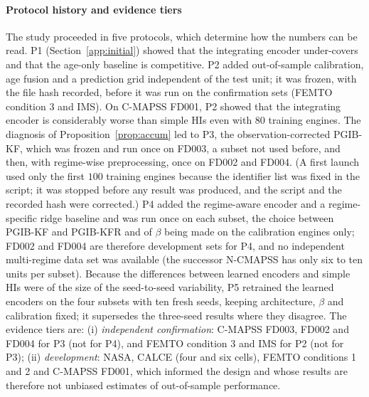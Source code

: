 \documentclass[preprint,12pt]{elsarticle}
\theoremstyle{definition}
\begin{document}
\paragraph{Protocol history and evidence tiers} The study proceeded in five protocols, which determine how the numbers can be read. P1 (Section~\ref{app:initial}) showed that the integrating encoder under-covers and that the age-only baseline is competitive. P2 added out-of-sample calibration, age fusion and a prediction grid independent of the test unit; it was frozen, with the file hash recorded, before it was run on the confirmation sets (FEMTO condition 3 and IMS). On C-MAPSS FD001, P2 showed that the integrating encoder is considerably worse than simple HIs even with $80$ training engines. The diagnosis of Proposition~\ref{prop:accum} led to P3, the observation-corrected PGIB-KF, which was frozen and run once on FD003, a subset not used before, and then, with regime-wise preprocessing, once on FD002 and FD004. (A first launch used only the first $100$ training engines because the identifier list was fixed in the script; it was stopped before any result was produced, and the script and the recorded hash were corrected.) P4 added the regime-aware encoder and a regime-specific ridge baseline and was run once on each subset, the choice between PGIB-KF and PGIB-KFR and of $\beta$ being made on the calibration engines only; FD002 and FD004 are therefore development sets for P4, and no independent multi-regime data set was available (the successor N-CMAPSS has only six to ten units per subset). Because the differences between learned encoders and simple HIs were of the size of the seed-to-seed variability, P5 retrained the learned encoders on the four subsets with ten fresh seeds, keeping architecture, $\beta$ and calibration fixed; it supersedes the three-seed results where they disagree. The evidence tiers are: (i) \emph{independent confirmation}: C-MAPSS FD003, FD002 and FD004 for P3 (not for P4), and FEMTO condition 3 and IMS for P2 (not for P3); (ii) \emph{development}: NASA, CALCE (four and six cells), FEMTO conditions 1 and 2 and C-MAPSS FD001, which informed the design and whose results are therefore not unbiased estimates of out-of-sample performance.
\end{document}

